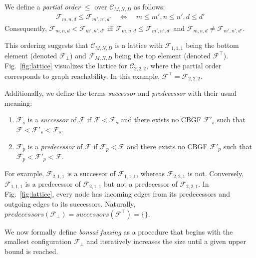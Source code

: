 \documentclass[conference]{IEEEtran}
\newcommand{\tech}{bonsai fuzzing} \newcommand{\Tech}{Bonsai fuzzing} \newcommand{\TECH}{Bonsai Fuzzing}
\begin{document}
We define a \emph{partial order} $\le$ over $\mathcal{C}_{M,N,D}$ as follows: \begin{align*}
    \mathcal{F}_{m, n, d} \le \mathcal{F}_{m', n', d'} \quad \Longleftrightarrow \quad  m \le m', n \le n',d \le d' 
\end{align*}
\noindent Consequently, $\mathcal{F}_{m, n, d} < \mathcal{F}_{m', n', d'}$ iff $\mathcal{F}_{m, n, d} \le \mathcal{F}_{m', n', d'}$ and $\mathcal{F}_{m, n, d} \neq \mathcal{F}_{m', n', d'}$.


This ordering suggests that $\mathcal{C}_{M,N,D}$ is a lattice with $\mathcal{F}_{1,1,1}$ being the bottom element (denoted $\mathcal{F}_\bot$) and $\mathcal{F}_{M,N,D}$ being the top element (denoted $\mathcal{F}^\top$). Fig.~\ref{fig:lattice} visualizes the lattice for $\mathcal{C}_{2,2,2}$, where the partial order corresponds to graph reachability. In this example, $\mathcal{F}^\top = \mathcal{F}_{2,2,2}$.





Additionally, we define the terms \emph{successor} and \emph{predecessor} with their usual meaning:
\begin{enumerate}
    \item $\mathcal{F}_s$ is a \emph{successor} of $\mathcal{F}$ if $\mathcal{F} < \mathcal{F}_s$ and there exists no CBGF $\mathcal{F}'_s$ such that $\mathcal{F} < \mathcal{F}'_s < \mathcal{F}_s$.
    \item $\mathcal{F}_p$ is a \emph{predecessor} of $\mathcal{F}$ if $\mathcal{F}_p < \mathcal{F}$ and there exists no CBGF $\mathcal{F}'_p$ such that $\mathcal{F}_p < \mathcal{F}'_p < \mathcal{F}$. 
\end{enumerate}
For example, $\mathcal{F}_{2,1,1}$ is a successor of $\mathcal{F}_{1,1,1}$, whereas $\mathcal{F}_{2,2,1}$ is not. Conversely, $\mathcal{F}_{1,1,1}$ is a predecessor of $\mathcal{F}_{2,1,1}$ but not a predecessor of $\mathcal{F}_{2,2,1}$. In Fig.~\ref{fig:lattice}, every node has incoming edges from its predecessors and outgoing edges to its successors. Naturally,  $\mathit{predecessors}(\mathcal{F}_{\bot}) = \mathit{successors}(\mathcal{F}^{\top}) = \{\}$.


We now formally define \emph{\tech{}} as a procedure that begins with the smallest configuration $\mathcal{F}_\bot$ and iteratively increases the size until a given upper bound is reached. 
\end{document}
